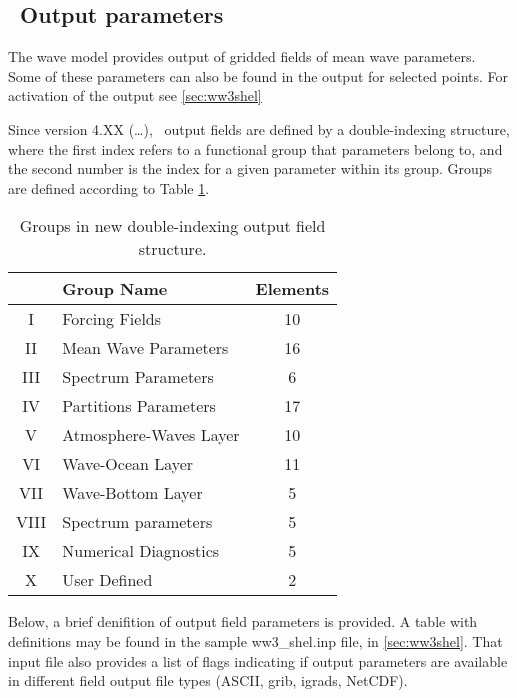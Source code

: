 \vssub
\subsection{~Output parameters} \label{sub:outpars}
\vssub

The wave model provides output of gridded fields of mean wave
parameters. Some of these parameters can also be found in the output for
selected points. For activation of the output see \para\ref{sec:ww3shel}

Since version 4.XX (\ldots), \ws\ output fields are defined by a
double-indexing structure, where the first index refers to a functional group
that parameters belong to, and the second number is the index for a given
parameter within its group. Groups are defined according to Table
\ref{tab:noge}.

\begin{table} \begin{center}
 \begin{tabular}{|c|l|c|} \hline \hline
     & Group Name & Elements \\ \hline
 I   & Forcing Fields & 10 \\
 II  & Mean Wave Parameters & 16 \\ 
 III & Spectrum Parameters & 6 \\
 IV  & Partitions Parameters & 17 \\
 V   & Atmosphere-Waves Layer & 10 \\
 VI  & Wave-Ocean Layer & 11 \\
 VII & Wave-Bottom Layer & 5 \\
 VIII& Spectrum parameters & 5 \\
 IX  & Numerical Diagnostics & 5 \\
 X   & User Defined & 2 \\ \hline
\end{tabular} \end{center}
\caption{Groups in new double-indexing output field structure.}
\label{tab:noge} \botline \end{table}

Below, a brief denifition of output field parameters is provided. A table
with definitions may be found in the sample {\code ww3\_shel.inp} file,
in \para\ref{sec:ww3shel}. That input file also provides a list of flags  
indicating if output parameters are available in different field
output file types (ASCII, grib, igrads, NetCDF). 

